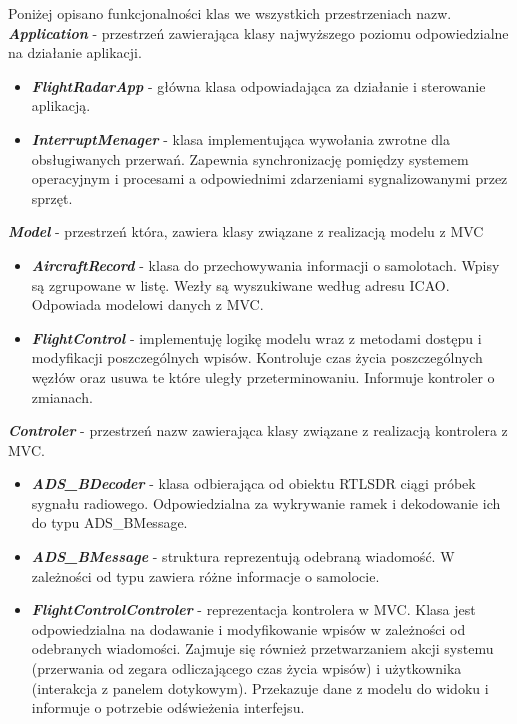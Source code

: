 \documentclass[eng,printmode]{mgr}
\begin{document}
\noindent
Poniżej opisano funkcjonalności klas we wszystkich przestrzeniach nazw.
\\


\noindent
\textbf{\textit{Application}} - przestrzeń zawierająca klasy najwyższego poziomu odpowiedzialne na działanie aplikacji.
\begin{itemize}[label={}]
  \item \textbf{\textit{FlightRadarApp}} - główna klasa odpowiadająca za działanie i sterowanie aplikacją.
  \item \textbf{\textit{InterruptMenager}} - klasa implementująca wywołania zwrotne dla obsługiwanych przerwań. Zapewnia synchronizację pomiędzy systemem operacyjnym i procesami a odpowiednimi zdarzeniami sygnalizowanymi przez sprzęt.
\end{itemize}
\vskip 0.55cm

\noindent
\textbf{\textit{Model}} - przestrzeń która, zawiera klasy związane z realizacją modelu z MVC
\begin{itemize}[label={}]
  \item \textbf{\textit{AircraftRecord}} - klasa do przechowywania informacji o samolotach. Wpisy są zgrupowane w listę. Wezły są wyszukiwane według adresu ICAO. Odpowiada modelowi danych z MVC.
  \item \textbf{\textit{FlightControl}} - implementuję logikę modelu wraz z metodami dostępu i modyfikacji poszczególnych wpisów. Kontroluje czas życia poszczególnych węzłów oraz usuwa te które uległy przeterminowaniu. Informuje kontroler o zmianach.
\end{itemize}
\vskip 0.55cm

\noindent
\textbf{\textit{Controler}} - przestrzeń nazw zawierająca klasy związane z realizacją kontrolera z MVC.
\begin{itemize}[label={}]
  \item \textbf{\textit{ADS\_BDecoder}} - klasa odbierająca od obiektu RTLSDR ciągi próbek sygnału radiowego. Odpowiedzialna za wykrywanie ramek i dekodowanie ich do typu ADS\_BMessage.
  \item \textbf{\textit{ADS\_BMessage}} - struktura reprezentują odebraną wiadomość. W zależności od typu zawiera różne informacje o samolocie.
  \item \textbf{\textit{FlightControlControler}} - reprezentacja kontrolera w MVC. Klasa jest odpowiedzialna na dodawanie i modyfikowanie wpisów w zależności od odebranych wiadomości. Zajmuje się również przetwarzaniem akcji systemu (przerwania od zegara odliczającego czas życia wpisów) i użytkownika (interakcja z panelem dotykowym). Przekazuje dane z modelu do widoku i informuje o potrzebie odświeżenia interfejsu.
\end{itemize}
\vskip 0.55cm
\end{document}
